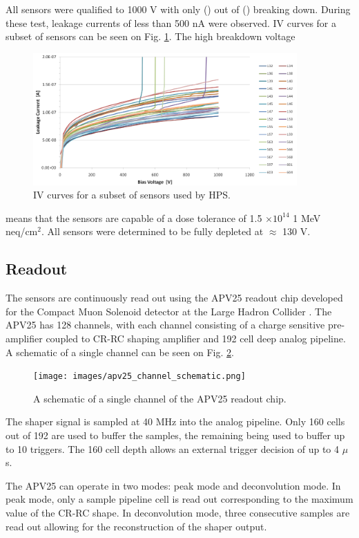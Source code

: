 All sensors were qualified to 1000 V with only () out of () breaking down.  
During these test, leakage currents of less than 500 nA were observed.
IV curves for a subset of sensors can be seen on Fig. \ref{fig:sensor_iv_curves}.
The high breakdown voltage
\begin{figure}
    \centering
    \includegraphics[width=0.9\textwidth]{images/sensor_iv_curves.png}
    \caption{IV curves for a subset of sensors used by HPS.}
    \label{fig:sensor_iv_curves}
\end{figure}
means that the sensors are capable of a dose tolerance of  1.5 
$\times 10^{14}$ 1 MeV neq/cm$^{2}$.  All sensors were determined to be fully 
depleted at $\approx$ 130 V. 

\subsection{Readout}

The sensors are continuously read out using the APV25 readout chip developed for
the Compact Muon Solenoid detector at the Large Hadron Collider 
\cite{apvdesign}. The APV25 has 128 channels, with each channel consisting
of a charge sensitive pre-amplifier coupled to CR-RC shaping amplifier and 192
cell deep analog pipeline.  A schematic of a single channel can be seen on 
Fig. \ref{fig:apv25_schem}.
\begin{figure}
    \centering
    \texttt{[image: images/apv25\_channel\_schematic.png]}
    \caption{A schematic of a single channel of the APV25 readout chip.}
    \label{fig:apv25_schem}
\end{figure}

The shaper signal is sampled at 40 MHz into the analog pipeline.  Only 160 cells
out of 192 are used to buffer the samples, the remaining being used to buffer
up to 10 triggers.  The 160 cell depth allows an external trigger decision of 
up to 4 $\mu$s.    

The APV25 can operate in two modes: peak mode and deconvolution mode.  In peak
mode, only a sample pipeline cell is read out corresponding to the maximum 
value of the CR-RC shape.  In deconvolution mode, three consecutive samples are
read out allowing for the reconstruction of the shaper output.

